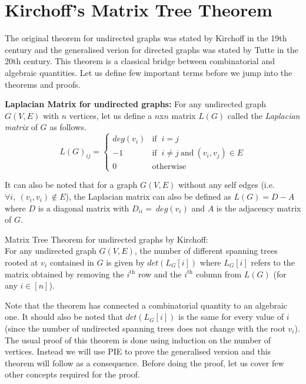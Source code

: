 \section{Kirchoff’s Matrix Tree Theorem} \label{sec:kirchoff's application}
The original theorem for undirected graphs was stated by Kirchoff in the 19th century and the generalised verion for directed graphs was stated by Tutte in the 20th century. This theorem is a classical bridge between combinatorial and algebraic quantities. Let us define few important terms before we jump into the theorems and proofs.\\
\begin{definition}\textbf{Laplacian Matrix for undirected graphs:} 
For any undirected graph $G(V,E)$ with $n$ vertices, let us define a $n$x$n$ matrix $L(G)$ called the \textit{Laplacian matrix} of $G$ as follows.
\[
  L(G)_{ij} = 
  \begin{cases}
    deg(v_i) &\mbox{if }~ i = j\\
    -1 &\mbox{if }~ i \neq j ~\text{and}~(v_i,v_j)\in E\\
    0 &\mbox{otherwise}
  \end{cases}
\]
\end{definition}
\noindent
It can also be noted that for a graph $G(V,E)$ without any self edges (i.e. $\forall i, ~ (v_i,v_i) \notin E$), the Laplacian matrix can also be defined as $L(G) = D - A$ where $D$ is a diagonal matrix with $D_{ii} = ~deg(v_i)$ and $A$ is the adjacency matrix of $G$.
\begin{theorem} Matrix Tree Theorem for undirected graphs by Kirchoff:\\
For any undirected graph $G(V,E)$, the number of different spanning trees rooted at $v_i$ contained in $G$ is given by $det(L_G[i])$ where $L_G[i]$ refers to the matrix obtained by removing the $i^{\text{th}}$ row and the $i^{\text{th}}$ column from $L(G)$ (for any $i \in [n]$).
\end{theorem}
\noindent
Note that the theorem has connected a combinatorial quantity to an algebraic one. It should also be noted that $det(L_G[i])$ is the same for every value of $i$ (since the number of undirected spanning trees does not change with the root $v_i$). The usual proof of this theorem is done using induction on the number of vertices. Instead we will use PIE to prove the generalised version and this theorem will follow as a consequence. Before doing the proof, let us cover few other concepts required for the proof.
